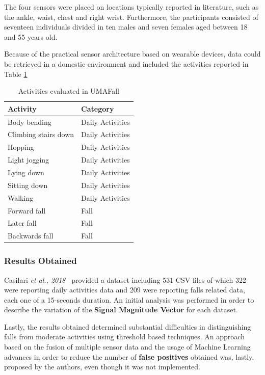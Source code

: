 The four sensors were placed on locations typically reported in literature, such as the ankle, waist, chest and right wrist. Furthermore, the participants consisted of seventeen individuals divided in ten males and seven females aged between 18 and 55 years old.

Because of the practical sensor architecture based on wearable devices, data could be retrieved in a domestic environment and included the activities reported in Table \ref{toc:umafall}

\begin{table}[H]
\centering
\begin{tabular}{ll}
    \hline
    Activity                & Category \\
    \hline
    Body bending            & Daily Activities \\
    Climbing stairs down    & Daily Activities \\
    Hopping                 & Daily Activities \\
    Light jogging           & Daily Activities \\
    Lying down              & Daily Activities \\
    Sitting down            & Daily Activities \\
    Walking                 & Daily Activities \\
    Forward fall            & Fall \\
    Later fall              & Fall \\
    Backwards fall          & Fall \\
    \hline
\end{tabular}
\caption{Activities evaluated in UMAFall}
\label{toc:umafall}
\end{table}

\subsubsection{Results Obtained}\label{subsubsec:umafall-results}

Casilari \textit{et al., 2018}~\cite{umafall} provided a dataset including 531 CSV files of which 322 were reporting daily activities data and 209 were reporting falls related data, each one of a 15-seconds duration. An initial analysis was performed in order to describe the variation of the \textbf{Signal Magnitude Vector} for each dataset.

Lastly, the results obtained determined substantial difficulties in distinguishing falls from moderate activities using threshold based techniques. An approach based on the fusion of multiple sensor data and the usage of Machine Learning advances in order to reduce the number of \textbf{false positives} obtained was, lastly, proposed by the authors, even though it was not implemented.

